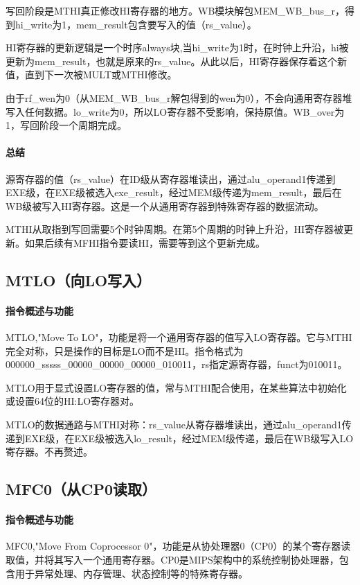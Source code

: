 \documentclass[a4paper]{article}
\begin{document}
	写回阶段是MTHI真正修改HI寄存器的地方。WB模块解包MEM\_WB\_bus\_r，得到hi\_write为1，mem\_result包含要写入的值（rs\_value）。
	
	HI寄存器的更新逻辑是一个时序always块,当hi\_write为1时，在时钟上升沿，hi被更新为mem\_result，也就是原来的rs\_value。从此以后，HI寄存器保存着这个新值，直到下一次被MULT或MTHI修改。
	
	由于rf\_wen为0（从MEM\_WB\_bus\_r解包得到的wen为0），不会向通用寄存器堆写入任何数据。lo\_write为0，所以LO寄存器不受影响，保持原值。WB\_over为1，写回阶段一个周期完成。
	\paragraph{总结}
	源寄存器的值（rs\_value）在ID级从寄存器堆读出，通过alu\_operand1传递到EXE级，在EXE级被选入exe\_result，经过MEM级传递为mem\_result，最后在WB级被写入HI寄存器。这是一个从通用寄存器到特殊寄存器的数据流动。
	
	MTHI从取指到写回需要5个时钟周期。在第5个周期的时钟上升沿，HI寄存器被更新。如果后续有MFHI指令要读HI，需要等到这个更新完成。
	
	\subsection{MTLO（向LO写入）}
	\paragraph{指令概述与功能}
	MTLO,"Move To LO"，功能是将一个通用寄存器的值写入LO寄存器。它与MTHI完全对称，只是操作的目标是LO而不是HI。指令格式为000000\_sssss\_00000\_00000\_00000\_010011，rs指定源寄存器，funct为010011。
	
	MTLO用于显式设置LO寄存器的值，常与MTHI配合使用，在某些算法中初始化或设置64位的HI:LO寄存器对。
	
	MTLO的数据通路与MTHI对称：rs\_value从寄存器堆读出，通过alu\_operand1传递到EXE级，在EXE级被选入lo\_result，经过MEM级传递，最后在WB级写入LO寄存器。不再赘述。
	
	\subsection{MFC0（从CP0读取）}
	\paragraph{指令概述与功能}
	MFC0,"Move From Coprocessor 0"，功能是从协处理器0（CP0）的某个寄存器读取值，并将其写入一个通用寄存器。CP0是MIPS架构中的系统控制协处理器，包含用于异常处理、内存管理、状态控制等的特殊寄存器。
	
\end{document}
